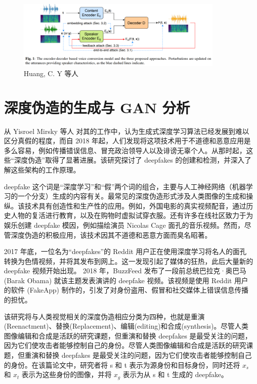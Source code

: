 \begin{figure}[htb]
\centering 
\includegraphics[width=0.90\textwidth]{img/ch4m15.png} 
\caption{ Huang, C. Y 等人 \cite{9383529}}
\label{Test}
\end{figure}

\section{深度伪造的生成与 GAN 分析}

从 Yisroel Mirsky 等人 \cite{DBLP:journals/corr/abs-2004-11138} 对其的工作中，认为生成式深度学习算法已经发展到难以区分真假的程度，而自 2018 年起，人们发现将这项技术用于不道德和恶意应用是多么容易，例如传播错误信息、冒充政治领导人以及诽谤无辜个人。从那时起，这些“深度伪造”取得了显著进展。该研究探讨了 deepfakes 的创建和检测，并深入了解这些架构的工作原理。

deepfake 这个词是“深度学习”和“假”两个词的组合，主要与人工神经网络（机器学习的一个分支）生成的内容有关。最常见的深度伪造形式涉及人类图像的生成和操纵。该技术具有创造性和生产性的应用。例如，外国电影的真实视频配音，通过历史人物的复活进行教育，以及在购物时虚拟试穿衣服。还有许多在线社区致力于为娱乐创建 deepfake 模因，例如描绘演员 Nicolas Cage 面孔的音乐视频。然而，尽管深度伪造的积极应用，该技术因其不道德和恶意方面而臭名昭著。

2017 年底，一位名为“deepfakes”的 Reddit 用户正在使用深度学习将名人的面孔转换为色情视频，并将其发布到网上。这一发现引起了媒体的狂热，此后大量新的 deepfake 视频开始出现。 2018 年，BuzzFeed 发布了一段前总统巴拉克·奥巴马 (Barak Obama) 就该主题发表演讲的 deepfake 视频。该视频是使用 Reddit 用户的软件 (FakeApp) 制作的，引发了对身份盗用、假冒和社交媒体上错误信息传播的担忧。

该研究将与人类视觉相关的深度伪造相应分类为四种，也就是重演(Reenactment)、替换(Replacement)、编辑(editing)和合成(synthesis)。尽管人类图像编辑和合成是活跃的研究课题，但重演和替换 deepfakes 是最受关注的问题，因为它们使攻击者能够控制自己的身份。尽管人类图像编辑和合成是活跃的研究课题，但重演和替换 deepfakes 是最受关注的问题，因为它们使攻击者能够控制自己的身份。在该篇论文中，研究者将 s 和 t 表示为源身份和目标身份，同时还将 $x_s$ 和 $x_t$ 表示为这些身份的图像，并将 $x_g$ 表示为从 s 和 t 生成的 deepfake。

